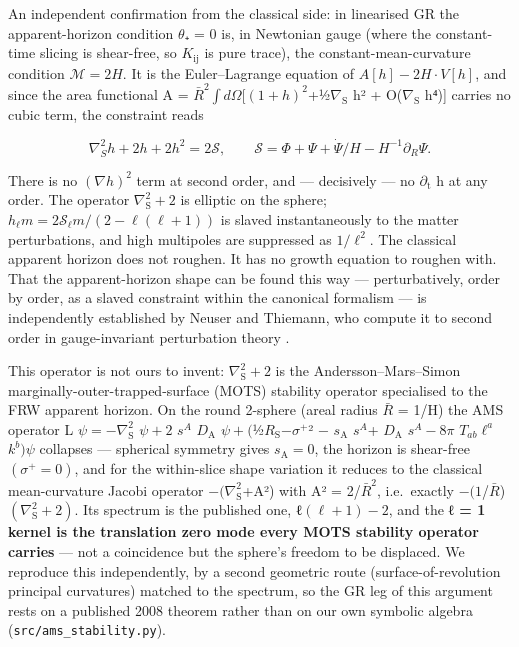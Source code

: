 \documentclass[aps,prd,preprint,nofootinbib,superscriptaddress]{revtex4-2}
\begin{document}
An independent confirmation from the classical side: in linearised GR
the apparent-horizon condition \(\theta\)₊ = 0 is, in Newtonian gauge
(where the constant-time slicing is shear-free, so \(K_{\mathrm{ij}}\)
is pure trace), the constant-mean-curvature condition
\(\mathcal{M}  = 2H\). It is the Euler--Lagrange equation of
\(A[h] - 2H\cdot V[h]\), and since the area functional A =
\(\bar{R}^2\)\(∫d\Omega [(1+h)^{2}\)+½\textbar{}\(\nabla _{\mathrm{S}}\)
h\textbar² + O(\textbar{}\(\nabla _{\mathrm{S}}\) h\textbar⁴){]} carries
no cubic term, the constraint reads

\begin{equation}\nabla_S^2 h + 2h + 2h^2 = 2\mathcal{S}, \qquad \mathcal{S} = \Phi + \Psi + \dot\Psi/H - H^{-1}\partial_R \Psi. \tag{2.9}\end{equation}

There is no \((\nabla h)^{2}\) term at second order, and --- decisively
--- no \(\partial _{\mathrm{t}}\) h at any order. The operator
\(\nabla ^{2}_{\mathrm{S}} + 2\) is elliptic on the sphere;
\(h_\ell m = 2\mathcal{S} _\ell m/(2 - \ell (\ell +1))\) is slaved
instantaneously to the matter perturbations, and high multipoles are
suppressed as \(1/\ell ^{2}\). The classical apparent horizon does not
roughen. It has no growth equation to roughen with. That the
apparent-horizon shape can be found this way --- perturbatively, order
by order, as a slaved constraint within the canonical formalism --- is
independently established by Neuser and Thiemann, who compute it to
second order in gauge-invariant perturbation theory
\citep{Neuser:2026unc}.

This operator is not ours to invent: \(\nabla ^{2}_{\mathrm{S}} + 2\) is
the Andersson--Mars--Simon marginally-outer-trapped-surface (MOTS)
stability operator \citep{Andersson:2007fh} specialised to the FRW
apparent horizon. On the round 2-sphere (areal radius \(\bar{R}\) = 1/H)
the AMS operator L \(\psi  = -\nabla ^{2}_{\mathrm{S}}\) \(\psi  + 2\)
\(s^{A}\) \(D_{\mathrm{A}}\)
\(\psi  + (\)½\(R_{\mathrm{S}}\)−\textbar{}\(\sigma ^{+}\)\textbar² −
\(s_{\mathrm{A}}\) \(s^{A}\)+ \(D_{\mathrm{A}}\) \(s^{A} - 8\pi\)
\(T_{ab}\ell ^{a}\) \(k^{b})\psi\) collapses --- spherical symmetry
gives \(s_{\mathrm{A}} = 0\), the horizon is shear-free
\((\sigma ^{+} = 0)\), and for the within-slice shape variation it
reduces to the classical mean-curvature Jacobi operator
\(-(\nabla ^{2}_{\mathrm{S}}\)+\textbar A\textbar²) with
\textbar A\textbar² = 2/\(\bar{R}^2\), i.e.~exactly
\(-(1\)/\(\bar{R}\))\((\nabla ^{2}_{\mathrm{S}} + 2)\). Its spectrum is
the published one, ℓ\((\ell +1) - 2\), and the \textbf{ℓ = 1 kernel is
the translation zero mode every MOTS stability operator carries} --- not
a coincidence but the sphere's freedom to be displaced. We reproduce
this independently, by a second geometric route (surface-of-revolution
principal curvatures) matched to the spectrum, so the GR leg of this
argument rests on a published 2008 theorem rather than on our own
symbolic algebra (\texttt{src/\allowbreak ams\_\allowbreak stability.\allowbreak py}).
\end{document}
